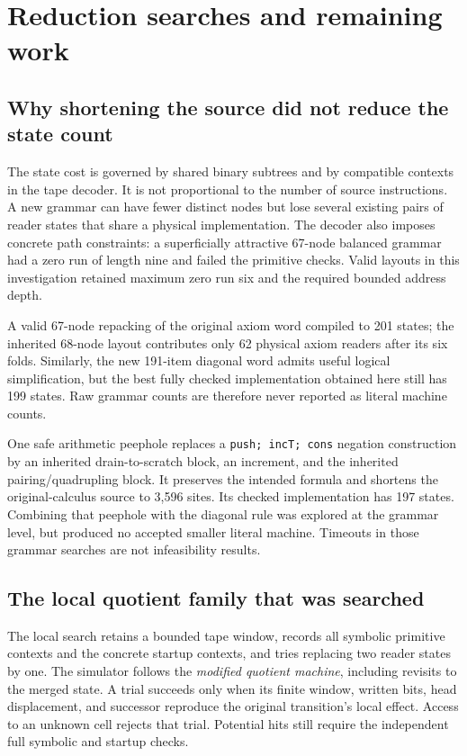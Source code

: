 \section{Reduction searches and remaining work}
\subsection{Why shortening the source did not reduce the state count}
The state cost is governed by shared binary subtrees and by compatible contexts in the tape decoder. It is not proportional to the number of source instructions. A new grammar can have fewer distinct nodes but lose several existing pairs of reader states that share a physical implementation. The decoder also imposes concrete path constraints: a superficially attractive 67-node balanced grammar had a zero run of length nine and failed the primitive checks. Valid layouts in this investigation retained maximum zero run six and the required bounded address depth.

A valid 67-node repacking of the original axiom word compiled to 201 states; the inherited 68-node layout contributes only 62 physical axiom readers after its six folds. Similarly, the new 191-item diagonal word admits useful logical simplification, but the best fully checked implementation obtained here still has 199 states. Raw grammar counts are therefore never reported as literal machine counts.

One safe arithmetic peephole replaces a \texttt{push; incT; cons} negation construction by an inherited drain-to-scratch block, an increment, and the inherited pairing/quadrupling block. It preserves the intended formula and shortens the original-calculus source to 3,596 sites. Its checked implementation has 197 states. Combining that peephole with the diagonal rule was explored at the grammar level, but produced no accepted smaller literal machine. Timeouts in those grammar searches are not infeasibility results.

\subsection{The local quotient family that was searched}
The local search retains a bounded tape window, records all symbolic primitive contexts and the concrete startup contexts, and tries replacing two reader states by one. The simulator follows the \emph{modified quotient machine}, including revisits to the merged state. A trial succeeds only when its finite window, written bits, head displacement, and successor reproduce the original transition's local effect. Access to an unknown cell rejects that trial. Potential hits still require the independent full symbolic and startup checks.

